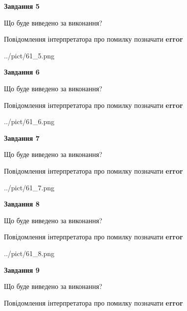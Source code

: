 \documentclass[11pt, ukrainian]{article}
\begin{document}
{\begin {large}
{\begin {center}\textbf{Завдання 5}\end {center}}\par
Що буде виведено за виконання? \par
Повідомлення інтерпретатора про помилку позначати \textbf{error}

\begin{center}
	{../pict/61_5.png}
\end{center}
\newpage

{\begin {center}\textbf{Завдання 6}\end {center}}\par
Що буде виведено за виконання? \par
Повідомлення інтерпретатора про помилку позначати \textbf{error}

\begin{center}
	{../pict/61_6.png}
\end{center}
\newpage

{\begin {center}\textbf{Завдання 7}\end {center}}\par
Що буде виведено за виконання? \par
Повідомлення інтерпретатора про помилку позначати \textbf{error}

\begin{center}
	{../pict/61_7.png}
\end{center}
\newpage

{\begin {center}\textbf{Завдання 8}\end {center}}\par
Що буде виведено за виконання? \par
Повідомлення інтерпретатора про помилку позначати \textbf{error}

\begin{center}
	{../pict/61_8.png}
\end{center}
\newpage

{\begin {center}\textbf{Завдання 9}\end {center}}\par
Що буде виведено за виконання? \par
Повідомлення інтерпретатора про помилку позначати \textbf{error}


\end{large}}
\end{document}
